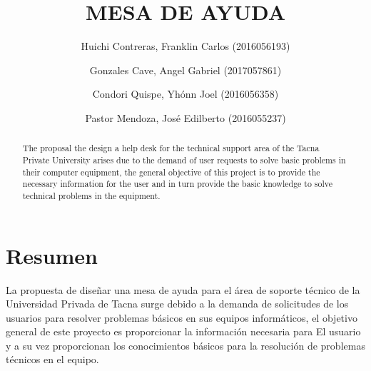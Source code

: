 \documentclass[preprint,12pt]{elsarticle}
\begin{document}
	
	\begin{frontmatter} 

		\title{\huge MESA DE AYUDA}
		
		\author{Huichi Contreras, Franklin Carlos            (2016056193)}
		\author{Gonzales Cave, Angel Gabriel                 (2017057861)}
		\author{Condori Quispe, Yhónn Joel	         	   (2016056358)} 
		\author{Pastor Mendoza, José Edilberto              (2016055237)} 
		\address{Escuela Profesional de Ingeniería de Sistemas}
		\address{Universidad Privada de Tacna}
		\address{Tacna, Perú}
		

		\begin{abstract}
The proposal the design a help desk for the technical support area of the Tacna Private University arises due to the demand of user requests to solve basic problems in their computer equipment, the general objective of this project is to provide the necessary information for the user and in turn provide the basic knowledge to solve technical problems in the equipment.

		\end{abstract}


	\end{frontmatter}


\section{Resumen}
La propuesta de diseñar una mesa de ayuda para el área de soporte técnico de la Universidad Privada de Tacna surge debido a la demanda de solicitudes de los usuarios para resolver problemas básicos en sus equipos informáticos, el objetivo general de este proyecto es proporcionar la información necesaria para El usuario y a su vez proporcionan los conocimientos básicos para la resolución de problemas técnicos en el equipo.


\end{document}
